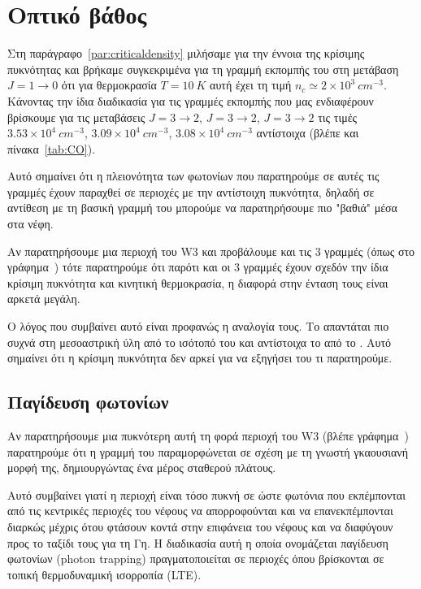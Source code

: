 \documentclass[a4paper,12pt]{memoir}
\newcommand{\e}[1]{\times 10^{#1}}
\begin{document}
\section{Οπτικό βάθος}
\label{par:od}
Στη παράγραφο~\ref{par:criticaldensity} μιλήσαμε για την έννοια της κρίσιμης πυκνότητας και βρήκαμε συγκεκριμένα για τη γραμμή εκπομπής του  στη μετάβαση $J=1\to 0$ ότι για θερμοκρασία $T=10\ K$ αυτή έχει τη τιμή $n_c \simeq 2\e{3} \ cm^{-3}$. 
Κάνοντας την ίδια διαδικασία για τις γραμμές εκπομπής που μας ενδιαφέρουν βρίσκουμε για τις μεταβάσεις  $J=3\to 2$,  $J=3\to 2$,  $J=3\to 2$ τις τιμές $3.53\e{4}\ cm^{-3}$, $3.09\e{4}\ cm^{-3}$, $3.08\e{4}\ cm^{-3}$ αντίστοιχα (βλέπε και πίνακα~\ref{tab:CO}).

Αυτό σημαίνει ότι η πλειονότητα των φωτονίων που παρατηρούμε σε αυτές τις γραμμές έχουν παραχθεί σε περιοχές με την αντίστοιχη πυκνότητα, δηλαδή σε αντίθεση με τη βασική γραμμή του  μπορούμε να παρατηρήσουμε πιο "βαθιά" μέσα στα νέφη.

Αν παρατηρήσουμε μια περιοχή του W3 και προβάλουμε και τις 3 γραμμές (όπως στο γράφημα~) τότε παρατηρούμε ότι παρότι και οι 3 γραμμές έχουν σχεδόν την ίδια κρίσιμη πυκνότητα και κινητική θερμοκρασία, η διαφορά στην ένταση τους είναι αρκετά μεγάλη. 

Ο λόγος που συμβαίνει αυτό είναι προφανώς η αναλογία τους. Το  απαντάται πιο συχνά στη μεσοαστρική ύλη από το ισότοπό του  και αντίστοιχα το  από το . Αυτό σημαίνει ότι η κρίσιμη πυκνότητα δεν αρκεί για να εξηγήσει του τι παρατηρούμε.

\subsection{Παγίδευση φωτονίων}
Αν παρατηρήσουμε μια πυκνότερη αυτή τη φορά περιοχή του W3 (βλέπε γράφημα~) παρατηρούμε ότι η γραμμή του  παραμορφώνεται σε σχέση με τη γνωστή γκαουσιανή μορφή της, δημιουργώντας ένα μέρος σταθερού πλάτους. 

Αυτό συμβαίνει γιατί η περιοχή είναι τόσο πυκνή σε  ώστε φωτόνια που εκπέμπονται από τις κεντρικές περιοχές του νέφους να απορροφούνται και να επανεκπέμπονται διαρκώς μέχρις ότου φτάσουν κοντά στην επιφάνεια του νέφους και να διαφύγουν προς το ταξίδι τους για τη Γη. Η διαδικασία αυτή η οποία ονομάζεται παγίδευση φωτονίων (photon trapping) πραγματοποιείται σε περιοχές όπου βρίσκονται σε τοπική θερμοδυναμική ισορροπία (LTE).
\end{document}
